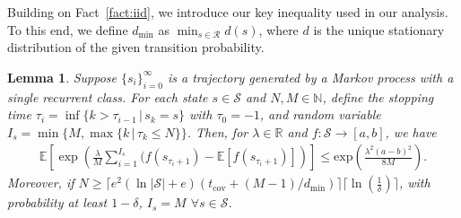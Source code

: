 \documentclass{article}
\newtheorem{lemma}[theorem]{Lemma}
\theoremstyle{definition}
\theoremstyle{remark}
\newcommand{\expec}{\mathbb{E}}
\newcommand{\real}{\mathbb{R}}
\newcommand{\cS}{\mathcal{S}}
\newcommand{\cR}{\mathcal{R}}
\begin{document}
Building on Fact~\ref{fact:iid}, we introduce our key inequality used in our analysis. To this end, we define $d_{\mathrm{min}}$ as $\min_{s\in \cR } d(s)$, where $d$ is the unique stationary distribution of the given transition probability.

\begin{lemma}\label{lem:sam_bd}
    Suppose $\{s_i\}^\infty_{i=0}$ is a trajectory generated by a Markov process with a single recurrent class. For each state $s\in \cS$ and $N,M \in \mathbb{N}$, define the stopping time $\tau_i = \inf \{k > \tau_{i-1} \,|\, s_{k}=s\}$
with $\tau_0=-1$, and random variable $I_s= \min \{M, \max \{k \,|\,  \tau_k \le N\}\}$. Then, for $\lambda \in \real$ and $f : \cS \rightarrow [a,b]$, we have 
\begin{align*}
    \expec\left[\exp \left(\frac{\lambda}{M}\sum^{I_s}_{i=1}(f(s_{\tau_{i}+1}) -\expec [f(s_{\tau_{i}+1})]\right)\right]  \le \mathrm{exp}\left( \frac{ \lambda^2(a-b)^2}{8M}\right).
\end{align*}
Moreover, if $ N \ge \lceil e^2( \ln|\cS|+e)( t_{\mathrm{cov}}+(M-1)/d_{\mathrm{min}})\rceil \lceil\ln \left(\frac{1}{\delta }\right)\rceil$, with probability at least $1-\delta$,  $I_s = M$  $\forall s \in \cS$.
\end{lemma}
\end{document}
